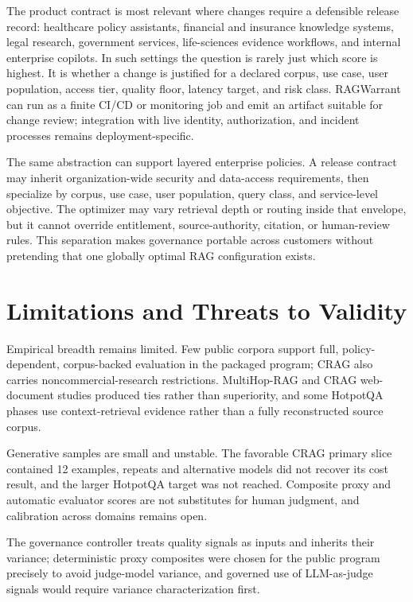 \documentclass[11pt]{article}
\begin{document}
The product contract is most relevant where changes require a defensible release record: healthcare policy assistants, financial and insurance knowledge systems, legal research, government services, life-sciences evidence workflows, and internal enterprise copilots. In such settings the question is rarely just which score is highest. It is whether a change is justified for a declared corpus, use case, user population, access tier, quality floor, latency target, and risk class. RAGWarrant can run as a finite CI/CD or monitoring job and emit an artifact suitable for change review; integration with live identity, authorization, and incident processes remains deployment-specific.

The same abstraction can support layered enterprise policies. A release contract may inherit organization-wide security and data-access requirements, then specialize by corpus, use case, user population, query class, and service-level objective. The optimizer may vary retrieval depth or routing inside that envelope, but it cannot override entitlement, source-authority, citation, or human-review rules. This separation makes governance portable across customers without pretending that one globally optimal RAG configuration exists.

\section{Limitations and Threats to Validity}
Empirical breadth remains limited. Few public corpora support full, policy-dependent, corpus-backed evaluation in the packaged program; CRAG also carries noncommercial-research restrictions. MultiHop-RAG and CRAG web-document studies produced ties rather than superiority, and some HotpotQA phases use context-retrieval evidence rather than a fully reconstructed source corpus.

Generative samples are small and unstable. The favorable CRAG primary slice contained 12 examples, repeats and alternative models did not recover its cost result, and the larger HotpotQA target was not reached. Composite proxy and automatic evaluator scores are not substitutes for human judgment, and calibration across domains remains open.

The governance controller treats quality signals as inputs and inherits their variance; deterministic proxy composites were chosen for the public program precisely to avoid judge-model variance, and governed use of LLM-as-judge signals would require variance characterization first.
\end{document}
